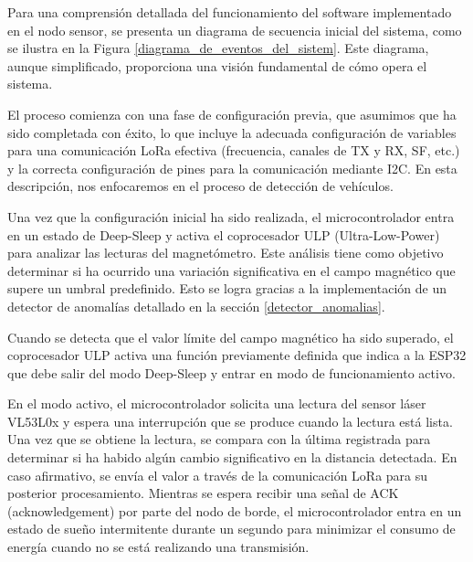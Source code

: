 Para una comprensión detallada del funcionamiento del software implementado en el nodo sensor, se presenta un diagrama de secuencia inicial del sistema, como se ilustra en la Figura \ref{diagrama_de_eventos_del_sistem}. Este diagrama, aunque simplificado, proporciona una visión fundamental de cómo opera el sistema.



El proceso comienza con una fase de configuración previa, que asumimos que ha sido completada con éxito, lo que incluye la adecuada configuración de variables para una comunicación LoRa efectiva (frecuencia, canales de TX y RX, SF, etc.) y la correcta configuración de pines para la comunicación mediante I2C. En esta descripción, nos enfocaremos en el proceso de detección de vehículos.


Una vez que la configuración inicial ha sido realizada, el microcontrolador entra en un estado de Deep-Sleep y activa el coprocesador ULP (Ultra-Low-Power) para analizar las lecturas del magnetómetro. Este análisis tiene como objetivo determinar si ha ocurrido una variación significativa en el campo magnético que supere un umbral predefinido. Esto se logra gracias a la implementación de un detector de anomalías detallado en la sección \ref{detector_anomalias}.



Cuando se detecta que el valor límite del campo magnético ha sido superado, el coprocesador ULP activa una función previamente definida que indica a la ESP32 que debe salir del modo Deep-Sleep y entrar en modo de funcionamiento activo.

En el modo activo, el microcontrolador solicita una lectura del sensor láser VL53L0x y espera una interrupción que se produce cuando la lectura está lista. Una vez que se obtiene la lectura, se compara con la última registrada para determinar si ha habido algún cambio significativo en la distancia detectada. En caso afirmativo, se envía el valor a través de la comunicación LoRa para su posterior procesamiento. Mientras se espera recibir una señal de ACK (acknowledgement) por parte del nodo de borde, el microcontrolador entra en un estado de sueño intermitente durante un segundo para minimizar el consumo de energía cuando no se está realizando una transmisión.

